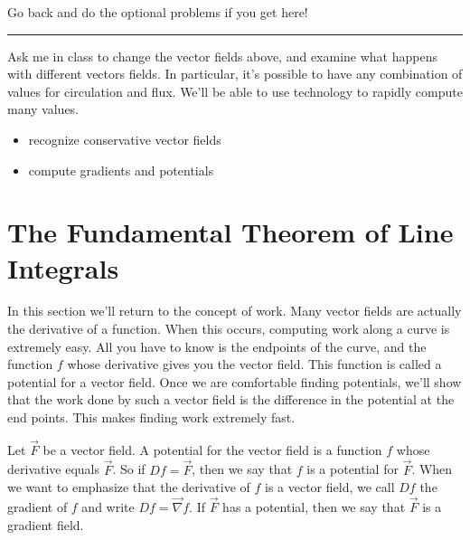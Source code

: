 \large
Go back and do the optional problems if you get here!
\vskip0.1in
\hrule
\normalsize
\vskip0.1in

Ask me in class to change the vector fields above, and examine what happens with different vectors fields.  In particular, it's possible to have any combination of values for circulation and flux. We'll be able to use technology to rapidly compute many values. 





%
%


\uday
\normalsize
\begin{itemize}
\item recognize conservative vector fields
\item compute gradients and potentials
\end{itemize}

\section{The Fundamental Theorem of Line Integrals}

In this section we'll return to the concept of work. Many vector fields are actually the derivative of a function.  When this occurs, computing work along a curve is extremely easy.  All you have to know is the endpoints of the curve, and the function $f$ whose derivative gives you the vector field. This function is called a potential for a vector field.  Once we are comfortable finding potentials, we'll show that the work done by such a vector field is the difference in the potential at the end points.  This makes finding work extremely fast.

\begin{definition}
%
 Let $\vec F$ be a vector field.  A potential for the vector field is a function $f$ whose derivative equals $\vec F$. So if $Df=\vec F$, then we say that $f$ is a potential for $\vec F$. When we want to emphasize that the derivative of $f$ is a vector field, we call $Df$ the gradient of $f$ and write $Df = \vec \nabla f$.
 If $\vec F$ has a potential, then we say that $\vec F$ is a gradient field. 
\end{definition}

